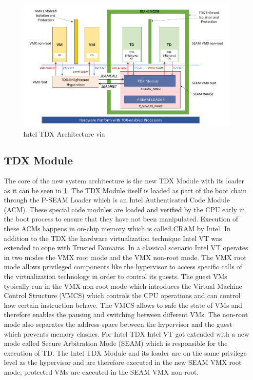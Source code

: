 \documentclass[sigplan,screen,nonacm]{acmart}
\begin{document}
\begin{figure}
  \centering
  \includegraphics[width=\linewidth]{pictures/Intel_TDX_Architecture.png}
  \caption{Intel TDX Architecture via \cite{cheng2023intel}}
  \label{fig:tdxarch}
\end{figure}

\subsection{TDX Module}
The core of the new system architecture is the new TDX Module with its loader as it can be seen in \cref{fig:tdxarch}.
The TDX Module itself is loaded as part of the boot chain through the P-SEAM Loader which is an Intel Authenticated Code Module (ACM).
These special code modules are loaded and verified by the CPU early in the boot process to ensure that they have not been manipulated.
Execution of these ACMs happens in on-chip memory which is called CRAM by Intel.
In addition to the TDX the hardware virtualization technique Intel VT was extended to cope with Trusted Domains.
In a classical scenario Intel VT operates in two modes the VMX root mode and the VMX non-root mode.
The VMX root mode allows privileged components like the hypervisor to access specific calls of the virtualization technology in order to control its guests.
The guest VMs typically run in the VMX non-root mode which introduces the Virtual Machine Control Structure (VMCS) which controls the CPU operations and can control how certain instruction behave. The VMCS allows to safe the state of VMs and therefore enables the pausing and switching between different VMs.
The non-root mode also separates the address space between the hypervisor and the guest which prevents memory clashes\cite{VTx}.
For Intel TDX Intel VT got extended with a new mode called Secure Arbitration Mode (SEAM) which is responsible for the execution of TD.
The Intel TDX Module  and its loader are on the same privilege level as the hypervisor and are therefore executed in the new SEAM VMX root mode, protected VMs are executed in the SEAM VMX non-root.
\end{document}
